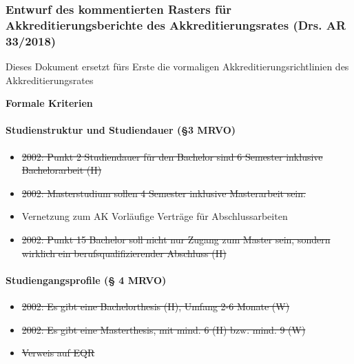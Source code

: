     \subsubsection*{Entwurf des kommentierten Rasters für Akkreditierungsberichte des Akkreditierungsrates (Drs. AR 33/2018)}
      Dieses Dokument ersetzt fürs Erste die vormaligen Akkreditierungsrichtlinien des Akkreditierungsrates

    \textbf{Formale Kriterien}
      \paragraph{Studienstruktur und Studiendauer (§3 MRVO)}
        \begin{itemize}
          \item \sout{2002: Punkt 2 Studiendauer für den Bachelor sind 6 Semester inklusive Bachelorarbeit (H)} %
          \item \sout{2002: Masterstudium sollen 4 Semester inklusive Masterarbeit sein.}
          \item Vernetzung zum AK Vorläufige Verträge für Abschlussarbeiten
          \item \sout{2002: Punkt 15 Bachelor soll nicht nur Zugang zum Master sein, sondern wirklich ein berufsqualifizierender Abschluss (H)}
        \end{itemize}

      \paragraph{Studiengangsprofile (§ 4 MRVO)}
        \begin{itemize}
          \item \sout{2002: Es gibt eine Bachelorthesis (H), Umfang 2-6 Monate (W)}
          \item \sout{2002: Es gibt eine Masterthesis, mit mind. 6 (H) bzw. mind. 9 (W)}
          \item \sout{Verweis auf EQR}
        \end{itemize}

